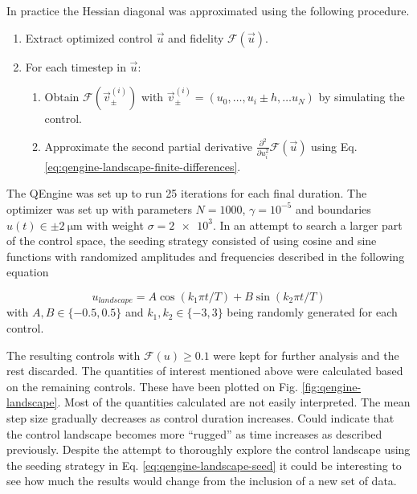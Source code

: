 \documentclass[a4paper, twocolumn]{revtex4-1}
\begin{document}
In practice the Hessian diagonal was approximated using the following procedure.
\begin{enumerate}
	\item Extract optimized control $\vec{u}$ and fidelity $\mathcal{F}(\vec{u})$.
	\item For each timestep in $\vec{u}$:
	\begin{enumerate}
		\item Obtain $\mathcal{F}(\vec{v}^{(i)}_\pm)$ with $\vec{v}^{(i)}_\pm = (u_0, \dots, u_i \pm h, \dots u_N)$ by simulating the control.
		\item Approximate the second partial derivative $\frac{\partial^2}{\partial u_i^2} \mathcal{F}(\vec{u})$ using Eq. \eqref{eq:qengine-landscape-finite-differences}.
	\end{enumerate}
\end{enumerate}

The QEngine was set up to run 25 iterations for each final duration. The  optimizer was set up with parameters $N=1000$, $\gamma = 10^{-5}$ and boundaries $u(t) \in \pm \SI{2}{\micro\meter}$ with weight $\sigma = \num{2e3}$. In an attempt to search a larger part of the control space, the seeding strategy consisted of using cosine and sine functions with randomized amplitudes and frequencies described in the following equation

\begin{equation}
	u_{landscape} = A \cos(k_1 \pi t/T) + B\sin(k_2 \pi t/T)
	\label{eq:qengine-landscape-seed}
\end{equation}
with $A,B \in \{-0.5,0.5\}$ and $k_1,k_2 \in \{-3,3\}$ being randomly generated for each control.

The resulting controls with $\mathcal{F}(u) \geq 0.1$ were kept for further analysis and the rest discarded. The quantities of interest mentioned above were calculated based on the remaining controls. These have been plotted on Fig. \ref{fig:qengine-landscape}. Most of the quantities calculated are not easily interpreted. The mean step size gradually decreases as control duration increases. Could indicate that the control landscape becomes more ``rugged'' as time increases as described previously. Despite the attempt to thoroughly explore the control landscape using the seeding strategy in Eq. \eqref{eq:qengine-landscape-seed} it could be interesting to see how much the results would change from the inclusion of a new set of data. 
\end{document}
